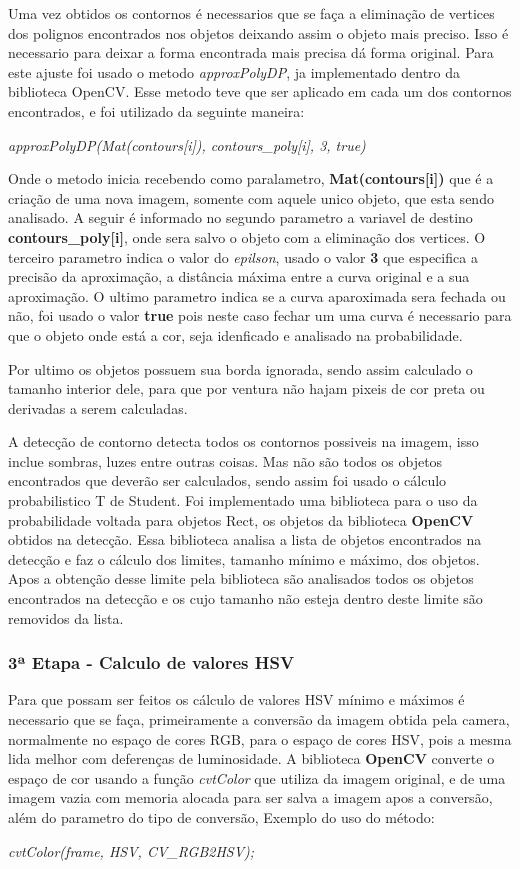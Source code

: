 Uma vez obtidos os contornos é necessarios que se faça a eliminação de vertices dos polignos encontrados nos objetos deixando assim o objeto mais preciso. Isso é necessario para deixar a forma encontrada mais precisa dá forma original. Para este ajuste foi usado o metodo \textit{approxPolyDP}, ja implementado dentro da biblioteca OpenCV. Esse metodo teve que ser aplicado em cada um dos contornos encontrados, e foi utilizado da seguinte maneira:
\begin{center}
\centering \textit{    approxPolyDP(Mat(contours[i]), contours\_poly[i], 3, true)}
\end{center}
 Onde o metodo inicia recebendo como paralametro, \textbf{Mat(contours[i])} que é a criação de uma nova imagem, somente com aquele unico objeto, que esta sendo analisado. A seguir é informado no segundo parametro a variavel de destino \textbf{contours\_poly[i]}, onde sera salvo o objeto com a eliminação dos vertices. O terceiro parametro indica o valor do \textit{epilson}, usado o valor \textbf{3} que especifica a precisão da aproximação, a distância máxima entre a curva original e a sua aproximação\cite{OpenCV}. O ultimo parametro indica se a curva aparoximada sera fechada ou não, foi usado o valor \textbf{true} pois neste caso fechar um uma curva é necessario para que o objeto onde está a cor, seja idenficado e analisado na probabilidade.
 
 Por ultimo os objetos possuem sua borda ignorada, sendo assim calculado o tamanho interior dele, para que por ventura não hajam pixeis de cor preta ou derivadas a serem calculadas.
 
 A detecção de contorno detecta todos os contornos possiveis na imagem, isso inclue sombras, luzes entre outras coisas. Mas não são todos os objetos encontrados que deverão ser calculados, sendo assim foi usado o cálculo probabilistico T de Student.
 Foi implementado uma biblioteca para o uso da probabilidade voltada para objetos Rect, os objetos da biblioteca \textbf{OpenCV} obtidos na detecção. Essa biblioteca analisa a lista de objetos encontrados na detecção e faz o cálculo dos limites, tamanho mínimo e máximo, dos objetos. Apos a obtenção desse limite pela biblioteca são analisados todos os objetos encontrados na detecção e os cujo tamanho não esteja dentro deste limite são removidos da lista.
 
 \subsubsection{3ª Etapa - Calculo de valores HSV}
 Para que possam ser feitos os cálculo de valores HSV mínimo e máximos é necessario que se faça, primeiramente a conversão da imagem obtida pela camera, normalmente no espaço de cores RGB, para o espaço de cores HSV, pois a mesma lida melhor com deferenças de luminosidade. 
 A biblioteca \textbf{OpenCV} converte o espaço de cor usando a função \textit{cvtColor} que utiliza da imagem original, e de uma imagem vazia com memoria alocada para ser salva a imagem apos a conversão, além do parametro do tipo de conversão, Exemplo do uso do método:
\begin{center}
\centering \textit{cvtColor(frame, HSV, CV\_RGB2HSV);}
\end{center}

